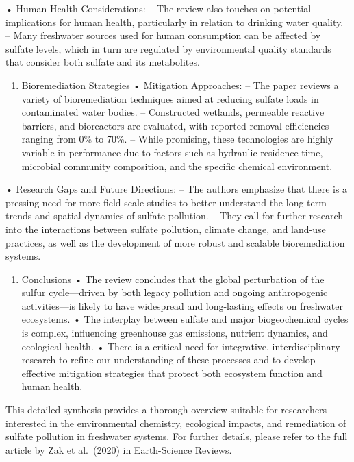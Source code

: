 \documentclass[12pt,twoside]{book}
\providecommand{\tightlist}{%
  \setlength{\itemsep}{0pt}\setlength{\parskip}{0pt}}
\begin{document}
• Human Health Considerations:
-- The review also touches on potential implications for human health, particularly in relation to drinking water quality.
-- Many freshwater sources used for human consumption can be affected by sulfate levels, which in turn are regulated by environmental quality standards that consider both sulfate and its metabolites.

\begin{enumerate}
\def\labelenumi{\arabic{enumi}.}
\setcounter{enumi}{4}
\tightlist
\item
  Bioremediation Strategies
  • Mitigation Approaches:
  -- The paper reviews a variety of bioremediation techniques aimed at reducing sulfate loads in contaminated water bodies.
  -- Constructed wetlands, permeable reactive barriers, and bioreactors are evaluated, with reported removal efficiencies ranging from 0\% to 70\%.
  -- While promising, these technologies are highly variable in performance due to factors such as hydraulic residence time, microbial community composition, and the specific chemical environment.
\end{enumerate}

• Research Gaps and Future Directions:
-- The authors emphasize that there is a pressing need for more field-scale studies to better understand the long-term trends and spatial dynamics of sulfate pollution.
-- They call for further research into the interactions between sulfate pollution, climate change, and land-use practices, as well as the development of more robust and scalable bioremediation systems.

\begin{enumerate}
\def\labelenumi{\arabic{enumi}.}
\setcounter{enumi}{5}
\tightlist
\item
  Conclusions
  • The review concludes that the global perturbation of the sulfur cycle---driven by both legacy pollution and ongoing anthropogenic activities---is likely to have widespread and long-lasting effects on freshwater ecosystems.
  • The interplay between sulfate and major biogeochemical cycles is complex, influencing greenhouse gas emissions, nutrient dynamics, and ecological health.
  • There is a critical need for integrative, interdisciplinary research to refine our understanding of these processes and to develop effective mitigation strategies that protect both ecosystem function and human health.
\end{enumerate}

This detailed synthesis provides a thorough overview suitable for researchers interested in the environmental chemistry, ecological impacts, and remediation of sulfate pollution in freshwater systems. For further details, please refer to the full article by Zak et al.~(2020) in Earth-Science Reviews.
\end{document}
